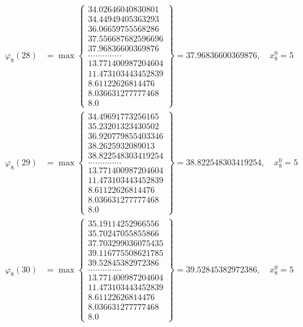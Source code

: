 \documentclass{article}
\begin{document}
\begin{align*}
  
  
  
\varphi_{8}(28) &= \max \left\{ \begin{array}{c}
34.02646040830801 \\
 34.44949405363293 \\
 36.06659755568286 \\
 37.556687682596696 \\
 37.96836600369876 \\
 .............. \\
 13.771400987204604 \\
 11.473103443452839 \\
 8.61122626814476 \\
 8.036631277777468 \\
 8.0
\end{array} \right\} = 37.96836600369876, \quad x_{8}^0 = 5\\
  
  
  
  
\varphi_{8}(29) &= \max \left\{ \begin{array}{c}
34.49691773256165 \\
 35.23201323430502 \\
 36.920779855403346 \\
 38.2625932089013 \\
 38.822548303419254 \\
 .............. \\
 13.771400987204604 \\
 11.473103443452839 \\
 8.61122626814476 \\
 8.036631277777468 \\
 8.0
\end{array} \right\} = 38.822548303419254, \quad x_{8}^0 = 5\\
  
  
  
  
\varphi_{8}(30) &= \max \left\{ \begin{array}{c}
35.19114252966556 \\
 35.70247055855866 \\
 37.703299036075435 \\
 39.116775508621785 \\
 39.52845382972386 \\
 .............. \\
 13.771400987204604 \\
 11.473103443452839 \\
 8.61122626814476 \\
 8.036631277777468 \\
 8.0
\end{array} \right\} = 39.52845382972386, \quad x_{8}^0 = 5\\
  

\end{align*}
\end{document}
